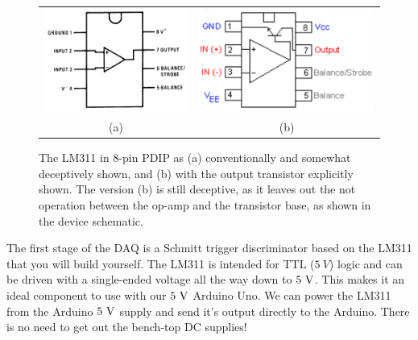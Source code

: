 \documentclass[12pt]{article}
\begin{document}
\begin{figure}[thbp]
\begin{center}
\begin{tabular}{cc}
{\includegraphics[height=0.2\textheight]{figs/LM311.png}} &
{\includegraphics[height=0.2\textheight]{figs/LM311-trans.png}} \\
(a) & (b) \\
\end{tabular}
\caption{\label{fig:lm311pin} The LM311 in 8-pin PDIP as (a) conventionally and somewhat deceptively shown, and (b) with the output transistor explicitly shown.  The version (b) is still deceptive, as it leaves out the not operation between the op-amp and the transistor base, as shown in the device schematic.}
\end{center}
\end{figure}

The first stage of the DAQ is a Schmitt trigger discriminator based on the LM311 that you will build yourself.
The LM311 is intended for TTL ($5~V$) logic and can be driven with a single-ended voltage all the way down to $5~\rm V$.  This makes it an ideal component to use with our $5~\rm V$ Arduino Uno.  We can power the LM311 from the Arduino $5~\rm V$ supply and send it's output directly to the Arduino.  There is no need to get out the bench-top DC supplies!
\end{document}
